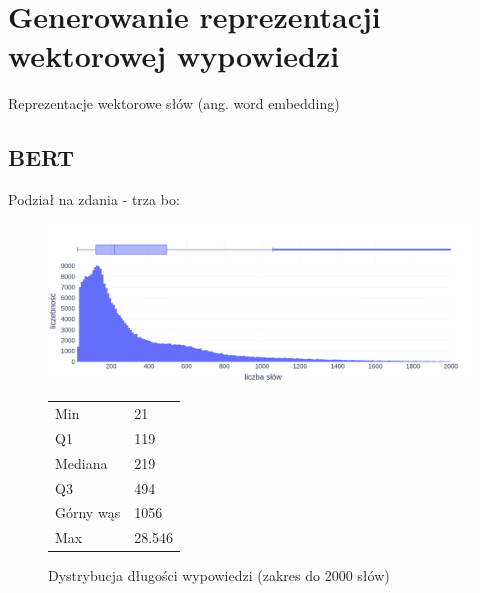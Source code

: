 
\chapter{Generowanie reprezentacji wektorowej wypowiedzi}
	Reprezentacje wektorowe słów (ang. word embedding)
\section{BERT}



  Podział na zdania - trza bo:
  \begin{figure}[ht]
    \begin{minipage}{.75\textwidth}\label{fig:word_count}
      \includegraphics[width=\textwidth]{rys03/word_count.png}
    \end{minipage}%
    \begin{minipage}{.25\textwidth}\label{tab:word_count}
      \small
      \begin{tabularx}{\textwidth}{l|l}
        Min & 21 \\ 
        Q1 & 119 \\ 
        Mediana & 219 \\
        Q3 & 494 \\ 
        Górny wąs & 1056 \\
        Max & 28.546 \\
      \end{tabularx}
    \end{minipage}
    \caption{Dystrybucja długości wypowiedzi (zakres do 2000 słów)}
  \end{figure}